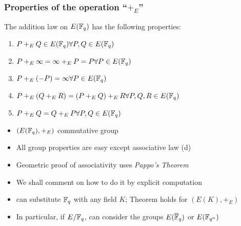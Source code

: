 \documentclass[10pt,handout]{beamer} %
\begin{document}
\begin{frame}
\frametitle{Properties of the operation ``$+_E$''}

\begin{Theorem}
 The addition law on $E(\mathbb F_q)$ has the following
properties:
\begin{enumerate}[<+-| alert@+>][(a)]
 \item $P+_EQ\in E(\F_q)\hfill\forall P,Q\in E(\F_q)$
 \item  $P+_E\infty=\infty+_E P=P\hfill\forall P\in E(\F_q)$
 \item  $P+_E(-P)=\infty\hfill\forall P\in E(\F_q)$
 \item  $P+_E(Q +_E R)=(P+_E Q)+_E R\hfill\forall P,Q,R\in E(\F_q)$
 \item  $P+_E Q=Q +_E P\hfill\forall P,Q\in E(\F_q)$
\end{enumerate}
 \end{Theorem}\pause

\begin{itemize}[<+-| alert@+>]
 \item $\left(E(\mathbb F_q),+_E\right)$  \alert{commutative group}
 \item All group properties are easy except \alert{associative law (d)}
 \item Geometric proof of associativity uses \emph{Pappo's Theorem}
 \item We shall comment on how to do it by explicit computation
 \item can substitute $\mathbb F_q$ with any field $K$; Theorem holds for $\left(E(K),+_E\right)$
\item In particular, if $E/\mathbb F_q$, can consider the groups $E(\overline{\mathbb F}_q)$ or $E(\mathbb F_{q^n})$
\end{itemize}
\end{frame}
\end{document}
